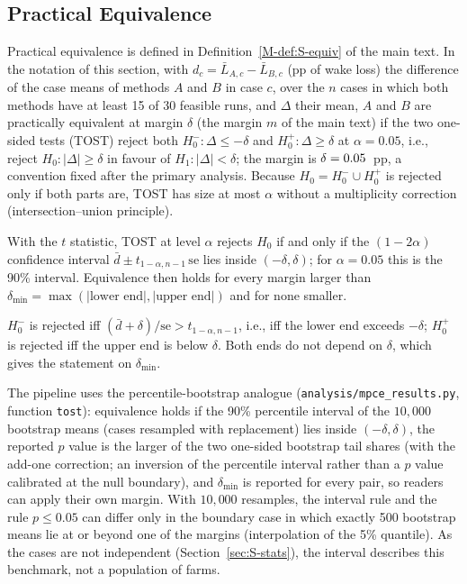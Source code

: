 \subsection{Practical Equivalence}
\label{sec:S-th-equiv}
Practical equivalence is defined in Definition~\ref{M-def:S-equiv} of the main text. In the notation of this section, with $d_c=\bar L_{A,c}-\bar L_{B,c}$ (pp of wake loss) the difference of the case means of methods $A$ and $B$ in case $c$, over the $n$ cases in which both methods have at least 15 of 30 feasible runs, and $\Delta$ their mean, $A$ and $B$ are practically equivalent at margin $\delta$ (the margin $m$ of the main text) if the two one-sided tests (TOST) reject both $H_0^-\colon\Delta\le-\delta$ and $H_0^+\colon\Delta\ge\delta$ at $\alpha=0.05$, i.e., reject $H_0\colon\lvert\Delta\rvert\ge\delta$ in favour of $H_1\colon\lvert\Delta\rvert<\delta$; the margin is $\delta=0.05$~pp, a convention fixed after the primary analysis.
Because $H_0=H_0^-\cup H_0^+$ is rejected only if both parts are, TOST has size at most $\alpha$ without a multiplicity correction (intersection--union principle).

\begin{lemS}
\label{lem:S-tost-ci}
With the $t$ statistic, TOST at level $\alpha$ rejects $H_0$ if and only if the $(1-2\alpha)$ confidence interval $\bar d\pm t_{1-\alpha,n-1}\,\mathrm{se}$ lies inside $(-\delta,\delta)$; for $\alpha=0.05$ this is the 90\% interval. Equivalence then holds for every margin larger than $\delta_{\min}=\max(\lvert\text{lower end}\rvert,\lvert\text{upper end}\rvert)$ and for none smaller.
\end{lemS}
\begin{thSproof}
$H_0^-$ is rejected iff $(\bar d+\delta)/\mathrm{se}>t_{1-\alpha,n-1}$, i.e., iff the lower end exceeds $-\delta$; $H_0^+$ is rejected iff the upper end is below $\delta$. Both ends do not depend on $\delta$, which gives the statement on $\delta_{\min}$.
\end{thSproof}
The pipeline uses the percentile-bootstrap analogue (\texttt{analysis/mpce\_results.py}, function \texttt{tost}): equivalence holds if the 90\% percentile interval of the $10{,}000$ bootstrap means (cases resampled with replacement) lies inside $(-\delta,\delta)$, the reported $p$ value is the larger of the two one-sided bootstrap tail shares (with the add-one correction; an inversion of the percentile interval rather than a $p$ value calibrated at the null boundary), and $\delta_{\min}$ is reported for every pair, so readers can apply their own margin. With $10{,}000$ resamples, the interval rule and the rule $p\le0.05$ can differ only in the boundary case in which exactly 500 bootstrap means lie at or beyond one of the margins (interpolation of the 5\% quantile). As the cases are not independent (Section~\ref{sec:S-stats}), the interval describes this benchmark, not a population of farms.


